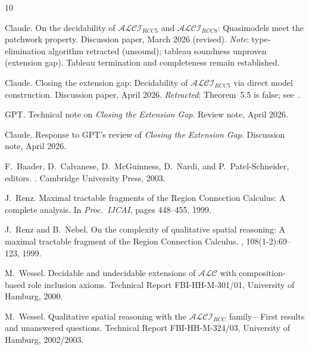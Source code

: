 \documentclass[a4paper,11pt]{article}
\theoremstyle{definition}
\begin{document}

\begin{thebibliography}{10}

Claude.
\newblock On the decidability of {$\mathcal{ALCI}_{\mathit{RCC5}}$} and
  {$\mathcal{ALCI}_{\mathit{RCC8}}$}: Quasimodels meet the patchwork
  property.
\newblock Discussion paper, March 2026 (revised).
\newblock \emph{Note}: type-elimination algorithm retracted (unsound);
  tableau soundness unproven (extension gap).  Tableau termination and
  completeness remain established.

Claude.
\newblock Closing the extension gap: Decidability of
  {$\mathcal{ALCI}_{\mathit{RCC5}}$} via direct model construction.
\newblock Discussion paper, April 2026.
\newblock \emph{Retracted}: Theorem~5.5 is false; see~\cite{GPTReview}.

GPT.
\newblock Technical note on \emph{Closing the Extension Gap}.
\newblock Review note, April 2026.

Claude.
\newblock Response to GPT's review of \emph{Closing the Extension Gap}.
\newblock Discussion note, April 2026.

F.~Baader, D.~Calvanese, D.~McGuinness, D.~Nardi, and P.~Patel-Schneider,
  editors.
.
\newblock Cambridge University Press, 2003.

J.~Renz.
\newblock Maximal tractable fragments of the {Region Connection Calculus}: A
  complete analysis.
\newblock In {\em Proc.\ IJCAI}, pages 448--455, 1999.

J.~Renz and B.~Nebel.
\newblock On the complexity of qualitative spatial reasoning: A maximal
  tractable fragment of the {Region Connection Calculus}.
, 108(1-2):69--123, 1999.

M.~Wessel.
\newblock Decidable and undecidable extensions of {$\mathcal{ALC}$} with
  composition-based role inclusion axioms.
\newblock Technical Report FBI-HH-M-301/01, University of Hamburg, 2000.

M.~Wessel.
\newblock Qualitative spatial reasoning with the
  {$\mathcal{ALCI}_\mathit{RCC}$} family---{F}irst results and unanswered
  questions.
\newblock Technical Report FBI-HH-M-324/03, University of Hamburg, 2002/2003.

\end{thebibliography}
\end{document}
